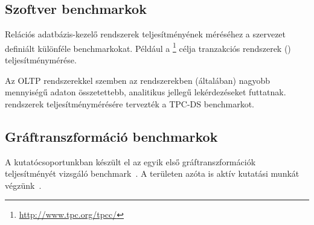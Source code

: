 \subsection{Szoftver benchmarkok}

Relációs adatbázis-kezelő rendszerek teljesítményének méréséhez a  szervezet definiált különféle benchmarkokat. Például a \footnote{\url{http://www.tpc.org/tpcc/}} célja tranzakciós rendszerek () teljesítménymérése.

\begin{megjegyzes}
Az OLTP rendszerekkel szemben az  rendszerekben (általában) nagyobb mennyiségű adaton összetettebb, analitikus jellegű lekérdezéseket futtatnak.  rendszerek teljesítménymérésére tervezték a \mbox{TPC-DS} benchmarkot.
\end{megjegyzes}


\subsection{Gráftranszformáció benchmarkok}

A kutatócsoportunkban készült el az egyik első gráftranszformációk teljesítményét vizsgáló benchmark~\cite{vlhcc05_vsv}. A területen azóta is aktív kutatási munkát végzünk~\cite{DBLP:conf/staf/SzarnyasSRV15}.

